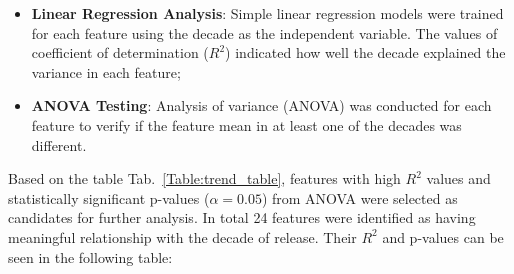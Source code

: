\begin{itemize}
  \item \textbf{Linear Regression Analysis}: Simple linear regression models
    were trained for each feature using the decade as the independent variable.
    The values of coefficient of determination ($R^2$) indicated how well the
    decade explained the variance in each feature;
  \item \textbf{ANOVA Testing}: Analysis of variance (ANOVA) was conducted for
    each feature to verify if the feature mean in at least one of the decades
    was different.
\end{itemize}

Based on the table Tab.~\ref{Table:trend_table}, features with high $R^2$
values and statistically significant p-values ($\alpha = 0.05$) from ANOVA were
selected as candidates for further analysis. In total 24 features were
identified as having meaningful relationship with the decade of release. Their
$R^2$ and p-values can be seen in the  following table:


